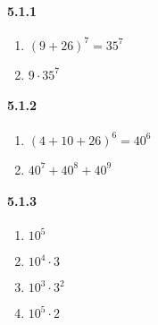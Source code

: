\documentclass[11pt, letterpaper, twocolumn, fleqn]{article}
\begin{document}
\renewcommand{\labelenumi}{\alph{enumi}.}
\renewcommand{\labelenumii}{(\arabic{enumii})}
\renewcommand{\qedsymbol}{$\blacksquare$}

\paragraph{5.1.1}
\begin{enumerate}
  \item $(9 + 26)^7 = 35^7$
  \item $9 \cdot 35^7$
\end{enumerate}

\paragraph{5.1.2}
\begin{enumerate}
  \item $(4 + 10 + 26)^6 = 40^6$
  \item $40^7 + 40^8 + 40^9$
\end{enumerate}

\paragraph{5.1.3}
\begin{enumerate}
  \item $10^5$
  \item $10^4 \cdot 3$
  \item $10^3 \cdot 3^2$
  \item $10^5 \cdot 2$
\end{enumerate}
\end{document}
